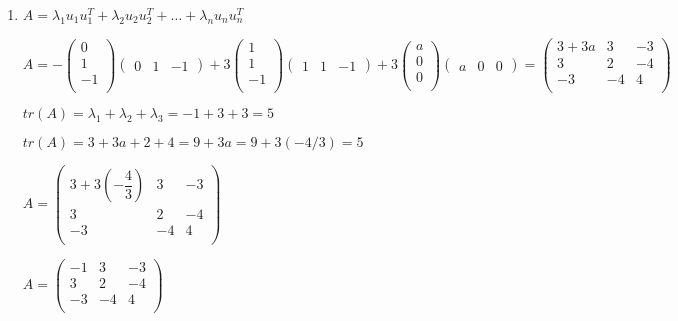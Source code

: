 \documentclass[12pt,letterpaper]{article}
\begin{document}
\begin{enumerate}[label=(\alph*)]
        \item
        $A = \lambda_1u_1u_1^T + \lambda_2u_2u_2^T + \dots + \lambda_nu_nu_n^T$
        
        $A = -\begin{pmatrix}
            0 \\
            1 \\
            -1 \\
        \end{pmatrix} \begin{pmatrix}0 & 1 & -1\end{pmatrix} + 3 \begin{pmatrix}
            1 \\
            1 \\
            -1 \\
        \end{pmatrix} \begin{pmatrix}1 & 1 & -1\end{pmatrix} + 3\begin{pmatrix}
            a \\
            0 \\
            0 \\
        \end{pmatrix} \begin{pmatrix}a & 0 & 0\end{pmatrix} = \begin{pmatrix}
            3 + 3a & 3 & -3 \\
            3 & 2 & -4 \\
            -3 & -4 & 4 \\
        \end{pmatrix}$
        
        $tr(A) = \lambda_1 + \lambda_2 + \lambda_3 = -1 + 3 + 3 = 5$
        
        $tr(A) = 3 + 3a + 2 + 4 = 9 + 3a = 9 + 3 (-4/3) = 5$
        
        $A = \begin{pmatrix}
            3 + 3(-\dfrac{4}{3}) & 3 & -3 \\
            3 & 2 & -4 \\
            -3 & -4 & 4 \\
        \end{pmatrix}$
        
        $A = \begin{pmatrix}
            -1 & 3 & -3 \\
            3 & 2 & -4 \\
            -3 & -4 & 4 \\
        \end{pmatrix}$
    \end{enumerate}
\end{document}
